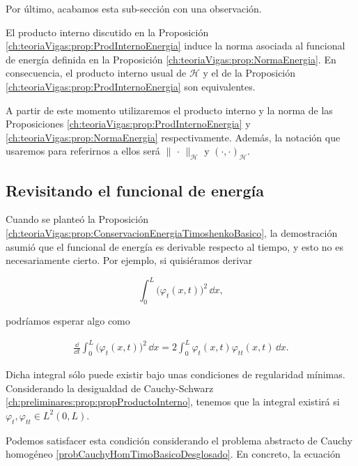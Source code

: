 Por último, acabamos esta sub-sección con una observación.\\

\begin{Observacion}
    \label{ch:teoriaVigas:obs:nuevaNorma}

    El producto interno discutido en la Proposición \ref{ch:teoriaVigas:prop:ProdInternoEnergia} induce la norma asociada al funcional de energía definida en la Proposición \ref{ch:teoriaVigas:prop:NormaEnergia}. En consecuencia, el producto interno usual de $\mathcal{H}$ y el de la Proposición \ref{ch:teoriaVigas:prop:ProdInternoEnergia} son equivalentes.
\end{Observacion}

A partir de este momento utilizaremos el producto interno y la norma de las Proposiciones \ref{ch:teoriaVigas:prop:ProdInternoEnergia} y \ref{ch:teoriaVigas:prop:NormaEnergia} respectivamente. Además, la notación que usaremos para referirnos a ellos será $\lVert \, \cdot \, \rVert_{\mathcal{H}}$ y $(\cdot , \cdot)_{\mathcal{H}}$.

\subsection{Revisitando el funcional de energía}
\label{ch:teoriaVigas:section:timoshenkoFunc:subsection:energia}
Cuando se planteó la Proposición \ref{ch:teoriaVigas:prop:ConservacionEnergiaTimoshenkoBasico}, la demostración asumió que el funcional de energía es derivable respecto al tiempo, y esto no es necesariamente cierto. Por ejemplo, si quisiéramos derivar 

\[\int_0^L \big(\varphi_t(x,t)\big)^2 \, \dd x,\]

podríamos esperar algo como

\begin{align}
\label{integralFuncionalEnergia}
\frac{\dd}{\dd t}\int_0^L \big(\varphi_t(x,t)\big)^2 \, \dd x = 2\int_0^L \varphi_t(x,t) \varphi_{tt}(x,t) \, \dd x.
\end{align}

Dicha integral sólo puede existir bajo unas condiciones de regularidad mínimas. Considerando la desigualdad de Cauchy-Schwarz \ref{ch:preliminares:prop:propProductoInterno}, tenemos que la integral existirá si $\varphi_t,\varphi_{tt} \in L^2(0,L)$. 

Podemos satisfacer esta condición considerando el problema abstracto de Cauchy homogéneo \eqref{probCauchyHomTimoBasicoDesglosado}. En concreto, la ecuación

